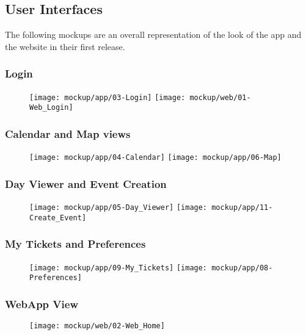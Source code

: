 \subsection{User Interfaces}
\label{subsect:User Interfaces}
	The following mockups are an overall representation of the look of the app and the website in their first release.
	\subsubsection{Login}
	\begin{figure}[H]
	\texttt{[image: mockup/app/03-Login]}
	\vspace{2.5cm}
	\texttt{[image: mockup/web/01-Web\_Login]}
	\centering 
	\end{figure}
	
	\subsubsection{Calendar and Map views}
	\begin{figure}[H]
	\texttt{[image: mockup/app/04-Calendar]}
	\hspace{2.5cm}
	\texttt{[image: mockup/app/06-Map]}
	\centering 
	\end{figure}
	
	\subsubsection{Day Viewer and Event Creation}
	\begin{figure}[H]
	\texttt{[image: mockup/app/05-Day\_Viewer]}
	\hspace{2.5cm}
	\texttt{[image: mockup/app/11-Create\_Event]}
	\centering 
	\end{figure}
	
	\subsubsection{My Tickets and Preferences}
	\begin{figure}[H]
	\texttt{[image: mockup/app/09-My\_Tickets]}
	\hspace{2.5cm}
	\texttt{[image: mockup/app/08-Preferences]}
	\centering 
	\end{figure}
	
	\subsubsection{WebApp View}
	\begin{figure}[H]
	\texttt{[image: mockup/web/02-Web\_Home]}
	\centering 
	\end{figure}
\newpage
